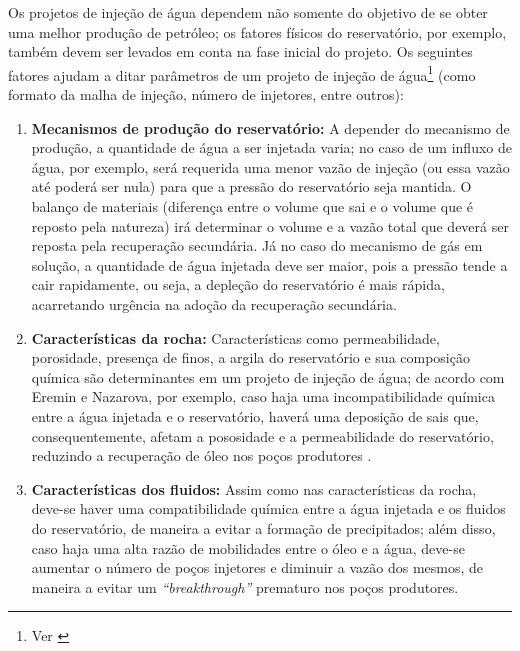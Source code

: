Os projetos de inje\c{c}\~{a}o de \'{a}gua dependem n\~{a}o somente do objetivo de se obter uma melhor produ\c{c}\~{a}o de petr\'{o}leo; os fatores f\'{i}sicos do reservat\'{o}rio, por exemplo, tamb\'{e}m devem ser levados em conta na fase inicial do projeto. Os seguintes fatores ajudam a ditar par\^{a}metros de um projeto de inje\c{c}\~{a}o de \'{a}gua\footnote{Ver \cite[pp. 652-653]{engres}} (como formato da malha de inje\c{c}\~{a}o, n\'{u}mero de injetores, entre outros):

\begin{enumerate}
\item \textbf{Mecanismos de produ\c{c}\~{a}o do reservat\'{o}rio:} A depender do mecanismo de produ\c{c}\~{a}o, a quantidade de \'{a}gua a ser injetada varia; no caso de um influxo de \'{a}gua, por exemplo, ser\'{a} requerida uma menor vaz\~{a}o de inje\c{c}\~{a}o (ou essa vaz\~{a}o at\'{e} poder\'{a} ser nula) para que a press\~{a}o do reservat\'{o}rio seja mantida. O balan\c{c}o de materiais (diferen\c{c}a entre o volume que sai e o volume que \'{e} reposto pela natureza) ir\'{a} determinar o volume e a vaz\~{a}o total que dever\'{a} ser reposta pela recupera\c{c}\~{a}o secund\'{a}ria. J\'{a} no caso do mecanismo de g\'{a}s em solu\c{c}\~{a}o, a quantidade de \'{a}gua injetada deve ser maior, pois a press\~{a}o tende a cair rapidamente, ou seja, a deple\c{c}\~{a}o do reservat\'{o}rio \'{e} mais r\'{a}pida, acarretando urg\^{e}ncia na ado\c{c}\~{a}o da recupera\c{c}\~{a}o secund\'{a}ria.

\item \textbf{Caracter\'{i}sticas da rocha:} Caracter\'{i}sticas como permeabilidade, porosidade, presen\c{c}a de finos, a argila do reservat\'{o}rio e sua composi\c{c}\~{a}o qu\'{i}mica s\~{a}o determinantes em um projeto de inje\c{c}\~{a}o de \'{a}gua; de acordo com Eremin e Nazarova, por exemplo, caso haja uma incompatibilidade qu\'{i}mica entre a \'{a}gua injetada e o reservat\'{o}rio, haver\'{a} uma deposi\c{c}\~{a}o de sais que, consequentemente, afetam a pososidade e a permeabilidade do reservat\'{o}rio, reduzindo a recupera\c{c}\~{a}o de \'{o}leo nos po\c{c}os produtores \cite{eremin}.

\item \textbf{Caracter\'{i}sticas dos fluidos:} Assim como nas caracter\'{i}sticas da rocha, deve-se haver uma compatibilidade qu\'{i}mica entre a \'{a}gua injetada e os fluidos do reservat\'{o}rio, de maneira a evitar a forma\c{c}\~{a}o de precipitados; al\'{e}m disso, caso haja uma alta raz\~{a}o de mobilidades entre o \'{o}leo e a \'{a}gua, deve-se aumentar o n\'{u}mero de po\c{c}os injetores e diminuir a vaz\~{a}o dos mesmos, de maneira a evitar um \textit{``breakthrough''} prematuro nos po\c{c}os produtores.


\end{enumerate}
